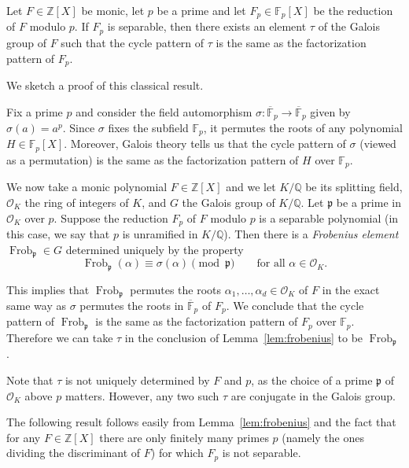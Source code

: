 \documentclass{book}
\newcommand{\longto}{\longrightarrow}
\newcommand{\ZZ}{\mathbb{Z}}
\newcommand{\FF}{\mathbb{F}}
\newcommand{\QQ}{\mathbb{Q}}
\newcommand{\Frob}{\operatorname{Frob}}
\begin{document}
\begin{lemma}
  \label{lem:frobenius}
  Let $F\in\ZZ[X]$ be monic, let $p$ be a prime and let $F_p\in\FF_p[X]$ be
  the reduction of $F$ modulo $p$.  If $F_p$ is separable, then there exists
  an element $\tau$ of the Galois group of $F$ such that the cycle pattern of
  $\tau$ is the same as the factorization pattern of $F_p$.
\end{lemma}

We sketch a proof of this classical result.

Fix a prime $p$ and consider the field automorphism
$\sigma\colon\overline{\FF}_p\longto\overline{\FF}_p$ given by $\sigma(a)=a^p$.
Since $\sigma$ fixes the subfield $\FF_p$, it permutes the roots of any
polynomial $H\in\FF_p[X]$.  Moreover, Galois theory tells us that the cycle
pattern of $\sigma$ (viewed as a permutation) is the same as the factorization
pattern of $H$ over $\FF_p$. 

We now take a monic polynomial $F\in\ZZ[X]$ and we let $K/\QQ$ be its
splitting field, $\mathcal{O}_K$ the ring of integers of $K$, and $G$ the
Galois group of $K/\QQ$.  Let $\mathfrak{p}$ be a prime in $\mathcal{O}_K$
over $p$.  Suppose the reduction $F_p$ of $F$ modulo $p$ is a separable
polynomial (in this case, we say that $p$ is unramified in $K/\QQ$).  Then
there is a \emph{Frobenius element} $\Frob_{\mathfrak{p}}\in G$ determined
uniquely by the property
\begin{equation*}
  \Frob_{\mathfrak{p}}(\alpha)\equiv\sigma(\alpha)\pmod{\mathfrak{p}}\qquad
  \text{for all }\alpha\in\mathcal{O}_K.
\end{equation*}

This implies that $\Frob_{\mathfrak{p}}$ permutes the roots
$\alpha_1,\ldots,\alpha_d\in\mathcal{O}_K$ of $F$ in the exact same way as
$\sigma$ permutes the roots in $\overline{\FF}_p$ of $F_p$.  We conclude that
the cycle pattern of $\Frob_{\mathfrak{p}}$ is the same as the factorization
pattern of $F_p$ over $\FF_p$.  Therefore we can take $\tau$ in the conclusion
of Lemma~\ref{lem:frobenius} to be $\Frob_{\mathfrak{p}}$.

Note that $\tau$ is not uniquely determined by $F$ and $p$, as the choice of a
prime $\mathfrak{p}$ of $\mathcal{O}_K$ above $p$ matters.  However, any two
such $\tau$ are conjugate in the Galois group.

The following result follows easily from Lemma~\ref{lem:frobenius} and the
fact that for any $F\in\ZZ[X]$ there are only finitely many primes $p$ (namely
the ones dividing the discriminant of $F$) for which $F_p$ is not separable.
\end{document}
